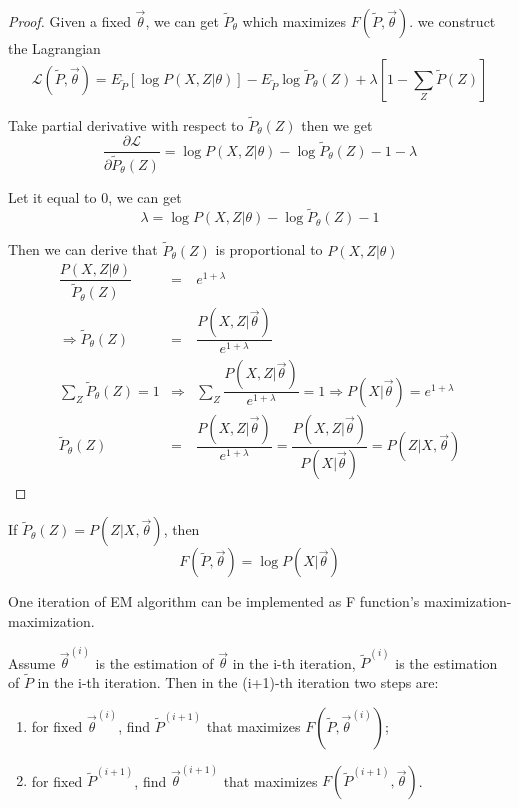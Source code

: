 \begin{proof}
Given a fixed $\vec{\theta}$, we can get $\tilde{P}_{\theta}$ which maximizes $F(\tilde{P},\vec{\theta})$. we construct the Lagrangian
\begin{equation}
\mathcal{L}(\tilde{P}, \vec{\theta})=E_{\tilde{P}}\left[\log{P(X,Z|\theta)}\right]-E_{\tilde{P}}\log\tilde{P}_{\theta}(Z)+\lambda\left[1-\sum\limits_Z{\tilde{P}(Z)}\right]
\end{equation}

Take partial derivative with respect to $\tilde{P}_{\theta}(Z)$ then we get
\begin{equation}
\dfrac{\partial \mathcal{L}}{\partial{\tilde{P}_{\theta}(Z)}}=\log{P(X,Z|\theta)}-\log\tilde{P}_{\theta}(Z)-1-\lambda  \nonumber
\end{equation}

Let it equal to 0, we can get
\begin{equation}
\lambda=\log{P(X,Z|\theta)}-\log\tilde{P}_{\theta}(Z)-1 \nonumber
\end{equation}

Then we can derive that $\tilde{P}_{\theta}(Z)$ is proportional to $P(X,Z|\theta)$
\begin{eqnarray}
\dfrac{P(X,Z|\theta)}{\tilde{P}_{\theta}(Z)} &=& e^{1+\lambda} \nonumber \\
\Rightarrow \tilde{P}_{\theta}(Z) &=& \dfrac{P(X,Z|\vec{\theta})}{e^{1+\lambda}} \nonumber \\
\sum\limits_Z{\tilde{P}_{\theta}(Z)}=1 & \Rightarrow & \sum\limits_Z{\dfrac{P(X,Z|\vec{\theta})}{e^{1+\lambda}}}=1 \Rightarrow P(X|\vec{\theta})=e^{1+\lambda} \nonumber \\
\tilde{P}_{\theta}(Z) &=& \dfrac{P(X,Z|\vec{\theta})}{e^{1+\lambda}} = \dfrac{P(X,Z|\vec{\theta})}{P(X|\vec{\theta})}=P(Z|X, \vec{\theta}) \nonumber
\end{eqnarray}
\end{proof}

\begin{lemma}
If $\tilde{P}_{\theta}(Z)=P(Z|X, \vec{\theta})$, then
\begin{equation}
F(\tilde{P},\vec{\theta})=\log P(X|\vec{\theta})
\end{equation}
\end{lemma}

\begin{theorem}
One iteration of EM algorithm can be implemented as F function's maximization-maximization.

Assume $\vec{\theta}^{(i)}$ is the estimation of $\vec{\theta}$ in the i-th iteration, $\tilde{P}^{(i)}$ is the estimation of $\tilde{P}$ in the i-th iteration. Then in the (i+1)-th iteration two steps are:
\begin{enumerate}
\item for fixed $\vec{\theta}^{(i)}$, find $\tilde{P}^{(i+1)}$ that maximizes $F(\tilde{P},\vec{\theta}^{(i)})$;
\item for fixed $\tilde{P}^{(i+1)}$, find $\vec{\theta}^{(i+1)}$ that maximizes $F(\tilde{P}^{(i+1)},\vec{\theta})$.
\end{enumerate}
\end{theorem}

